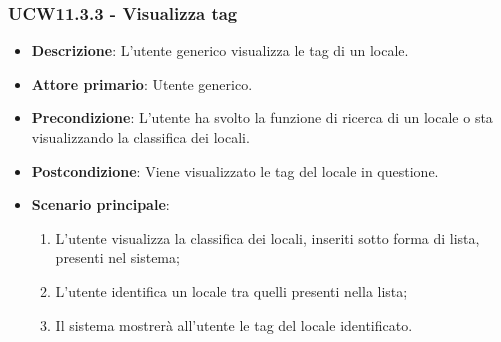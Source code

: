 \subsubsection{UCW11.3.3 - Visualizza tag}
\begin{itemize}
    \item \textbf{Descrizione}: L'utente generico visualizza le tag di un locale.
    \item \textbf{Attore primario}: Utente generico.
    \item \textbf{Precondizione}: L'utente ha svolto la funzione di ricerca di un locale o sta visualizzando la classifica dei locali.
    \item \textbf{Postcondizione}: Viene visualizzato le tag del locale in questione.
    \item \textbf{Scenario principale}: 
    \begin{enumerate}
        \item L'utente visualizza la classifica dei locali, inseriti sotto forma di lista, presenti nel sistema;
        \item L'utente identifica un locale tra quelli presenti nella lista;
        \item Il sistema mostrerà all'utente le tag del locale identificato.
        \end{enumerate}
\end{itemize}